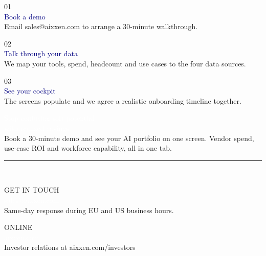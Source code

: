 \documentclass[10pt]{article}
\newcommand{\bodysize}{\fontsize{9.6}{15.2}\selectfont}
\begin{document}
\newcommand{\gs}[3]{%
\begin{minipage}[t]{0.313\textwidth}
\raggedright
{\black\fontsize{20}{20}\selectfont\textcolor{paleblue}{#1}}\\[5pt]
{\heavy\fontsize{10.3}{13}\selectfont\textcolor{navy}{#2}}\\[3pt]
{\fontsize{8.2}{11.2}\selectfont\textcolor{slate}{#3}}
\end{minipage}}

\gs{01}{Book a demo}{Email sales@aixxen.com to arrange a 30-minute walkthrough.}\hfill
\gs{02}{Talk through your data}{We map your tools, spend, headcount and use cases to the four data sources.}\hfill
\gs{03}{See your cockpit}{The screens populate and we agree a realistic onboarding timeline together.}

\vspace{24pt}
\begin{tcolorbox}[enhanced,colback=navy,colframe=navy,boxrule=0pt,arc=4pt,
  left=20pt,right=20pt,top=20pt,bottom=20pt]
{\black\fontsize{17}{21}\selectfont\textcolor{white}{Stop confusing soft potential\\with realized savings.}}\\[8pt]
{\bodysize\textcolor{linegray}{Book a 30-minute demo and see your AI portfolio on one screen. Vendor spend, use-case ROI and workforce capability, all in one tab.}}\\[14pt]
{\color{blue}\rule{\linewidth}{1pt}}\\[12pt]
\begin{minipage}[t]{0.55\textwidth}
{\semibold\fontsize{8}{8}\selectfont\textcolor{midblue}{GET IN TOUCH}}\\[4pt]
{\heavy\fontsize{11}{14}\selectfont\textcolor{white}{sales@aixxen.com}}\\[2pt]
{\fontsize{8.4}{12}\selectfont\textcolor{linegray}{Same-day response during EU and US business hours.}}
\end{minipage}\hfill
\begin{minipage}[t]{0.4\textwidth}
{\semibold\fontsize{8}{8}\selectfont\textcolor{midblue}{ONLINE}}\\[4pt]
{\heavy\fontsize{11}{14}\selectfont\textcolor{white}{aixxen.com}}\\[2pt]
{\fontsize{8.4}{12}\selectfont\textcolor{linegray}{Investor relations at aixxen.com/investors}}
\end{minipage}
\end{tcolorbox}
\newpage
\end{document}
